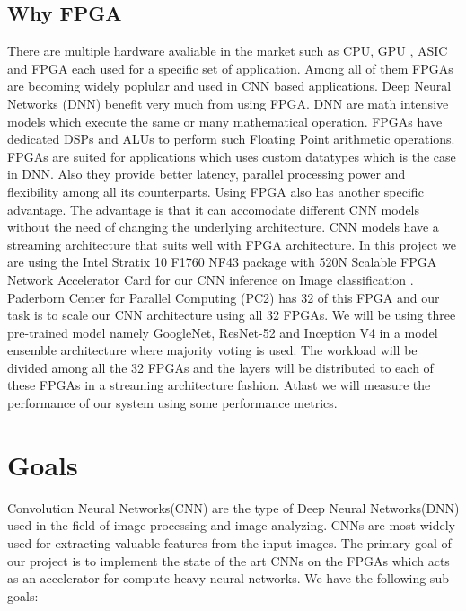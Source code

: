 \documentclass[titlepage]{report}
\begin{document}
\section{Why FPGA}
There are multiple hardware avaliable in the market such as CPU, GPU , ASIC and FPGA each used for a specific set of application. Among all of them FPGAs are becoming widely poplular and used in CNN based applications. Deep Neural Networks (DNN) benefit very much from using FPGA. DNN are math intensive models which execute the same or many mathematical operation. FPGAs have dedicated DSPs and ALUs to perform such Floating Point arithmetic operations. FPGAs are suited for applications which uses custom datatypes which is the case in DNN. Also they provide better latency, parallel processing power and flexibility among all its counterparts. Using FPGA also has another specific advantage. The advantage is that it can accomodate different CNN models without the need of changing the underlying architecture. CNN models have a streaming architecture that suits well with FPGA architecture.
In this project we are using the Intel Stratix 10 F1760 NF43 package with 520N Scalable FPGA Network Accelerator Card for our CNN inference on Image classification . Paderborn Center for Parallel Computing (PC2) has 32 of this FPGA and our task is to scale our CNN architecture using all 32 FPGAs. We will be using three pre-trained model namely GoogleNet, ResNet-52 and Inception V4 in a model ensemble architecture where majority voting is used. The workload will be divided among all the 32 FPGAs and the layers will be distributed to each of these FPGAs in a streaming architecture fashion. Atlast we will measure the performance of our system using some performance metrics.





\chapter{Goals}
Convolution Neural Networks(CNN) are the type of Deep Neural Networks(DNN) used in the field of image processing and image analyzing. CNNs are most widely used for extracting valuable features from the input images. The primary goal of our project is to implement the state of the art CNNs on the FPGAs which acts as an accelerator for compute-heavy neural networks. We have the following sub-goals:
\end{document}
